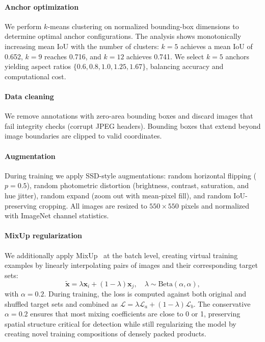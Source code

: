 \documentclass[conference]{IEEEtran}
\begin{document}
\paragraph{Anchor optimization}
We perform $k$-means clustering on normalized bounding-box dimensions
to determine optimal anchor configurations. The analysis shows
monotonically increasing mean IoU with the number of clusters: $k=5$
achieves a mean IoU of 0.652, $k=9$ reaches 0.716, and $k=12$ achieves
0.741. We select $k=5$ anchors yielding aspect ratios
$\{0.6, 0.8, 1.0, 1.25, 1.67\}$, balancing accuracy and computational
cost.

\paragraph{Data cleaning}
We remove annotations with zero-area bounding boxes and discard images
that fail integrity checks (corrupt JPEG headers). Bounding boxes that
extend beyond image boundaries are clipped to valid coordinates.

\paragraph{Augmentation}
During training we apply SSD-style augmentations: random horizontal
flipping ($p=0.5$), random photometric distortion (brightness, contrast,
saturation, and hue jitter), random expand (zoom out with mean-pixel
fill), and random IoU-preserving cropping. All images are resized to
$550 \times 550$ pixels and normalized with ImageNet channel statistics.

\paragraph{MixUp regularization}
We additionally apply MixUp~\cite{zhang2018mixup} at the batch level,
creating virtual training examples by linearly interpolating pairs of
images and their corresponding target sets:
\begin{equation}
  \tilde{\mathbf{x}} = \lambda \mathbf{x}_i + (1-\lambda) \mathbf{x}_j,
  \quad \lambda \sim \text{Beta}(\alpha, \alpha),
  \label{eq:mixup}
\end{equation}
with $\alpha = 0.2$. During training, the loss is computed against both
original and shuffled target sets and combined as
$\mathcal{L} = \lambda \mathcal{L}_a + (1-\lambda) \mathcal{L}_b$.
The conservative $\alpha = 0.2$ ensures that most mixing coefficients
are close to 0 or 1, preserving spatial structure critical for detection
while still regularizing the model by creating novel training
compositions of densely packed products.
\end{document}
